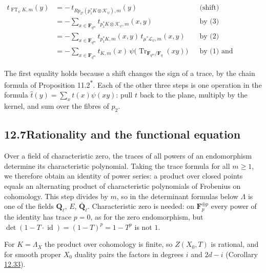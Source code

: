 \documentclass[11pt]{article}
\newcommand{\bpout}[1]{#1\textsuperscript{\hyperlink{bp-outside}{\ensuremath{\ast}}}}
\begin{document}
\[
\begin{aligned}
t_{\operatorname{FT}_\psi K,m}(y)
&=-\,t_{Rp_{2!}(p_1^*K\otimes\mathcal K_\psi),m}(y)
&&\text{(shift)}\\
&=-\sum_{x\in\mathbf F_{q^m}}t_{p_1^*K\otimes\mathcal K_\psi,m}(x,y)
&&\text{by (3)}\\
&=-\sum_{x\in\mathbf F_{q^m}}t_{p_1^*K,m}(x,y)\,t_{\mu^*\mathcal L_\psi,m}(x,y)
&&\text{by (2)}\\
&=-\sum_{x\in\mathbf F_{q^m}}t_{K,m}(x)\,
\psi\bigl(\operatorname{Tr}_{\mathbf F_{q^m}/\mathbf F_q}(xy)\bigr)
&&\text{by (1) and Lemma~16.1.1.}
\end{aligned}
\]

The first equality holds because a shift changes the sign of a trace, by the chain formula of Proposition \bpout{11.2}. Each of the other three steps is one operation in the formula \(\hat t(y)=\sum_xt(x)\psi(xy)\): pull \(t\) back to the plane, multiply by the kernel, and sum over the fibres of \(p_2\).


\subsection*{\texorpdfstring{12.7\quad Rationality and the functional equation}{12.7 Rationality and the functional equation}}
\label{bp87}%
\label{bp88}%
Over a field of characteristic zero, the traces of all powers of an endomorphism determine its characteristic polynomial. Taking the trace formula for all \(m\geq1\), we therefore obtain an identity of power series: a product over closed points equals an alternating product of characteristic polynomials of Frobenius on cohomology. This step divides by \(m\), so in the determinant formulas below \(\Lambda\) is one of the fields \(\mathbf Q_\ell\), \(E\), \(\overline{\mathbf Q}_\ell\). Characteristic zero is needed: on \(\mathbf F_p^{\oplus p}\) every power of the identity has trace \(p=0\), as for the zero endomorphism, but \(\det(1-T\cdot\operatorname{id})=(1-T)^p=1-T^p\) is not \(1\).

For \(K=\Lambda_X\) the product over cohomology is finite, so \(Z(X_0,T)\) is rational, and for smooth proper \(X_0\) duality pairs the factors in degrees \(i\) and \(2d-i\) (Corollary \hyperref[bp100]{12.33}).
\end{document}
